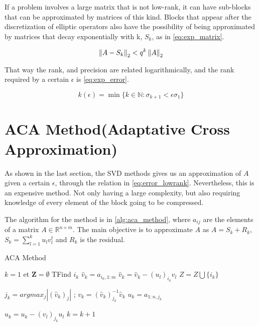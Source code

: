 If a problem involves a large matrix that is not low-rank, it can have sub-blocks that can be approximated by matrices of this kind. Blocks that appear after the discretization of elliptic operators also have the possibility of being approximated by matrices that decay exponentially with k, $S_{k}$, as in \ref{eq:exp_matrix}.

\begin{equation}\label{eq:exp_matrix}
    \left\lVert A-S_{k}\right\rVert_{2} < q^{k}\left\lVert A\right\rVert_{2}
\end{equation}


That way the rank, and precision are related logarithmically, and the rank required by a certain $\epsilon$ is \ref{eq:exp_error}.

\begin{equation}\label{eq:exp_error}
    k(\epsilon) = \min\{ k \in \mathbb{N} : \sigma_{k+1} < \epsilon\sigma_{1}\}
\end{equation}

\section{ACA Method(Adaptative Cross Approximation)}

As shown in the last section, the SVD methods gives us an approximation of $A$ given a certain $\epsilon$, through the relation in \ref{eq:error_lowrank}. Nevertheless, this is an expensive method. Not only having a large complexity, but also requiring knowledge of every element of the block going to be compressed.

The algorithm for the method is in \ref{alg:aca_method}, where $a_{ij}$ are the elements of a matrix $A \in \mathbb{R}^{n\times m}$. The main objective is to approximate $A$ as $A=S_{k} + R_{k}$, $S_{k} = \sum_{l=1}^{k} u_{l}v_{l}^{t}$ and $R_{k}$ is the residual.



\begin{algorithm}
    \caption{ACA Method}\label{alg:aca_method}
    \begin{algorithmic}[1]
        \State $k=1$ et $\mathbf{Z} = \emptyset $
        \Repeat
        \State TFind $i_{k}$
        \State $\hat{v}_{k} = a_{i_{k},1:m} $
        \State $\hat{v}_{k} = \hat{v}_{k} - (u_{l})_{i_{k}}v_{l} $
        \EndFor
        \State $Z = Z \bigcup \{ i_{k} \} $

        \State $j_{k} = argmax_{j}|(\hat{v}_{k})_{j}|$ ; $v_{k} = (\hat{v}_{k})^{-1}_{j_{k}} \hat{v}_{k}$
        \State $u_{k}=a_{1:n,j_{k}}$

        \State $u_{k}=u_{k} - (v_{l})_{j_{k}}u_{l}$
        \EndFor
        \State $k=k+1$

        \EndIf



    \end{algorithmic}
\end{algorithm}

